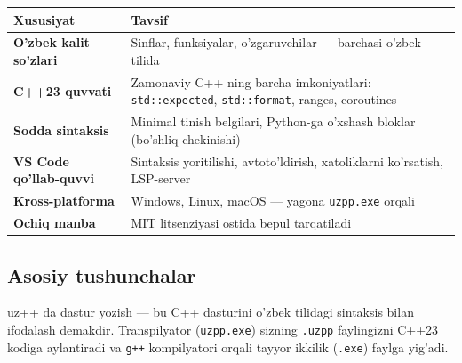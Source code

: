 \documentclass[a4paper,11pt,twoside,openright]{book}
\begin{document}
\begin{longtable}[]{@{}
  >{\raggedright\arraybackslash}p{}
  >{\raggedright\arraybackslash}p{}@{}}
\toprule\noalign{}
\begin{minipage}[b]{\linewidth}\raggedright
Xususiyat
\end{minipage} & \begin{minipage}[b]{\linewidth}\raggedright
Tavsif
\end{minipage} \\
\midrule\noalign{}
\endhead
\bottomrule\noalign{}
\endlastfoot
\textbf{O'zbek kalit so'zlari} & Sinflar, funksiyalar, o'zgaruvchilar ---
barchasi o'zbek tilida \\
\textbf{C++23 quvvati} & Zamonaviy C++ ning barcha imkoniyatlari:
\texttt{std::expected}, \texttt{std::format}, ranges, coroutines \\
\textbf{Sodda sintaksis} & Minimal tinish belgilari, Python-ga o'xshash bloklar
(bo'shliq chekinishi) \\
\textbf{VS Code qo'llab-quvvi} & Sintaksis yoritilishi, avtoto'ldirish,
xatoliklarni ko'rsatish, LSP-server \\
\textbf{Kross-platforma} & Windows, Linux, macOS --- yagona \texttt{uzpp.exe}
orqali \\
\textbf{Ochiq manba} & MIT litsenziyasi ostida bepul tarqatiladi \\
\end{longtable}

\subsection{Asosiy tushunchalar}\label{asosiy-tushunchalar}

uz++ da dastur yozish --- bu C++ dasturini o'zbek tilidagi sintaksis bilan
ifodalash demakdir. Transpilyator (\texttt{uzpp.exe}) sizning \texttt{.uzpp}
faylingizni C++23 kodiga aylantiradi va \texttt{g++} kompilyatori orqali tayyor
ikkilik (\texttt{.exe}) faylga yig'adi.
\end{document}
